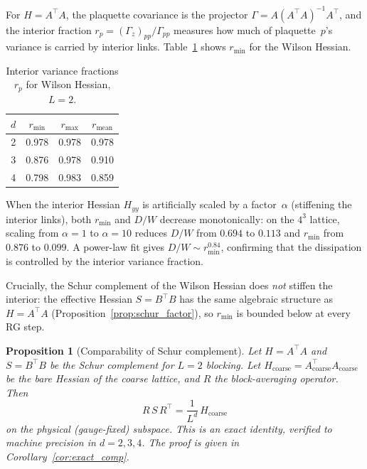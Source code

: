 \documentclass[11pt]{article}
\newtheorem{proposition}[theorem]{Proposition}
\theoremstyle{definition}
\begin{document}
For $H = A^\top A$, the plaquette covariance is the projector 
$\Gamma = A(A^\top A)^{-1}A^\top$, and the interior fraction 
$r_p = (\Gamma_z)_{pp}/\Gamma_{pp}$ measures how much of plaquette~$p$'s 
variance is carried by interior links.  Table~\ref{tab:rmin} shows $r_{\min}$ 
for the Wilson Hessian.

\begin{table}[h]
\centering
\caption{Interior variance fractions $r_p$ for Wilson Hessian, $L = 2$.}
\label{tab:rmin}
\begin{tabular}{cccc}
\toprule
$d$ & $r_{\min}$ & $r_{\max}$ & $r_{\mathrm{mean}}$ \\
\midrule
2 & 0.978 & 0.978 & 0.978 \\
3 & 0.876 & 0.978 & 0.910 \\
4 & 0.798 & 0.983 & 0.859 \\
\bottomrule
\end{tabular}
\end{table}

When the interior Hessian $H_{yy}$ is artificially scaled by a 
factor~$\alpha$ (stiffening the interior links), both $r_{\min}$ and 
$D/W$ decrease monotonically: on the $4^3$ lattice, scaling from 
$\alpha = 1$ to $\alpha = 10$ reduces $D/W$ from $0.694$ to $0.113$ 
and $r_{\min}$ from $0.876$ to $0.099$.  A power-law fit gives 
$D/W \sim r_{\min}^{0.84}$, confirming that the dissipation is controlled 
by the interior variance fraction.

Crucially, the Schur complement of the Wilson Hessian does \emph{not} 
stiffen the interior: the effective Hessian $S = B^\top B$ has the same 
algebraic structure as $H = A^\top A$ (Proposition~\ref{prop:schur_factor}), 
so $r_{\min}$ is bounded below at every RG step.

\begin{proposition}[Comparability of Schur complement]\label{prop:comparability}
Let $H = A^\top A$ and $S = B^\top B$ be the Schur complement for 
$L = 2$ blocking.  Let $H_{\mathrm{coarse}} = A_{\mathrm{coarse}}^\top 
A_{\mathrm{coarse}}$ be the bare Hessian of the coarse lattice, and $R$ 
the block-averaging operator.  Then
\begin{equation}\label{eq:RSR}
  R\,S\,R^\top = \frac{1}{L^d}\,H_{\mathrm{coarse}}
\end{equation}
on the physical (gauge-fixed) subspace.  This is an \emph{exact} identity, 
verified to machine precision in $d = 2, 3, 4$.  The proof is given in
Corollary~\ref{cor:exact_comp}.
\end{proposition}
\end{document}
